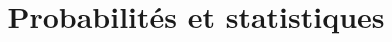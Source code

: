\documentclass[a4paper, 12pt]{report}
\title{Probabilités et statistiques}
\author{}
\begin{document}
\maketitle

\begin{abstract}

\end{abstract}

\tableofcontents









\end{document}
